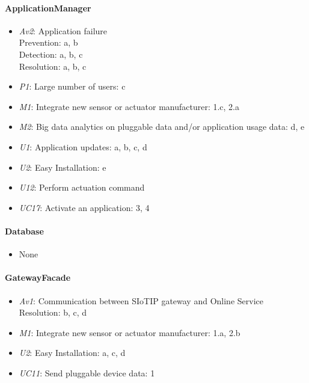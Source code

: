     \paragraph{ApplicationManager}
        \begin{itemize}
            \item  \emph{Av2}: Application failure \\
                   Prevention: a, b \\
                   Detection: a, b, c \\
                   Resolution: a, b, c
           \item \emph{P1}: Large number of users: c
           \item \emph{M1}: Integrate new sensor or actuator manufacturer: 1.c, 2.a
           \item \emph{M2}: Big data analytics on pluggable data and/or application usage data: d, e
           \item \emph{U1}: Application updates: a, b, c, d
           \item \emph{U2}: Easy Installation: e
           \item \emph{U12}: Perform actuation command
           \item \emph{UC17}: Activate an application: 3, 4
        \end{itemize}

    \paragraph{Database}
        \begin{itemize}
          	\item None
        \end{itemize}

    \paragraph{GatewayFacade}
        \begin{itemize}
            \item \emph{Av1}: Communication between SIoTIP gateway and Online Service \\
                               Resolution: b, c, d
            \item \emph{M1}: Integrate new sensor or actuator manufacturer: 1.a, 2.b
            \item \emph{U2}: Easy Installation: a, c, d
            \item \emph{UC11}: Send pluggable device data: 1
        \end{itemize}

